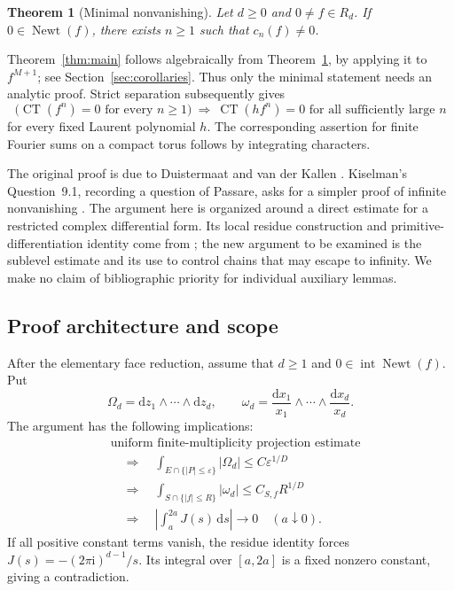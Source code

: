 \documentclass[11pt]{article}
\numberwithin{equation}{section}
\newtheorem{theorem}{Theorem}[section]
\theoremstyle{definition}
\theoremstyle{remark}
\newcommand{\CT}{\operatorname{CT}}
\newcommand{\Newt}{\operatorname{Newt}}
\newcommand{\Int}{\operatorname{int}}
\newcommand{\dd}{\mathrm d}
\newcommand{\ii}{\mathrm i}
\newcommand{\OmegaD}{\Omega_d}
\newcommand{\omegaD}{\omega_d}
\begin{document}
\begin{theorem}[Minimal nonvanishing]\label{thm:minimal}
Let $d\ge0$ and $0\ne f\in R_d$. If $0\in\Newt(f)$, there exists
$n\ge1$ such that $c_n(f)\ne0$.
\end{theorem}

Theorem~\ref{thm:main} follows algebraically from
Theorem~\ref{thm:minimal}, by applying it to $f^{M+1}$; see
Section~\ref{sec:corollaries}. Thus only the minimal statement needs an
analytic proof. Strict separation subsequently gives
\[
 \bigl(\CT(f^n)=0\text{ for every }n\ge1\bigr)
 \ \Longrightarrow\
 \CT(hf^n)=0\text{ for all sufficiently large }n
\]
for every fixed Laurent polynomial $h$. The corresponding assertion for
finite Fourier sums on a compact torus follows by integrating characters.

The original proof is due to Duistermaat and van der Kallen
\cite{DvK}. Kiselman's Question~9.1, recording a question of Passare,
asks for a simpler proof of infinite nonvanishing
\cite{Kiselman}. The argument here is organized around a direct estimate
for a restricted complex differential form. Its local residue construction
and primitive-differentiation identity come from
\cite[Sections 4--5]{DvK}; the new argument to be examined is the
sublevel estimate and its use to control chains that may escape to infinity.
We make no claim of bibliographic priority for individual auxiliary lemmas.

\subsection*{Proof architecture and scope}
After the elementary face reduction, assume that $d\ge1$ and
$0\in\Int\Newt(f)$. Put
\[
 \OmegaD=\dd z_1\wedge\cdots\wedge\dd z_d,\qquad
 \omegaD=\frac{\dd x_1}{x_1}\wedge\cdots\wedge\frac{\dd x_d}{x_d}.
\]
The argument has the following implications:
\begin{align*}
 &\text{uniform finite-multiplicity projection estimate}\\
 &\quad\Longrightarrow\quad
 \int_{E\cap\{|P|\le\varepsilon\}}|\OmegaD|
       \le C\varepsilon^{1/D}\\
 &\quad\Longrightarrow\quad
 \int_{S\cap\{|f|\le R\}}|\omegaD|\le C_{S,f}R^{1/D}\\
 &\quad\Longrightarrow\quad
 \left|\int_a^{2a}J(s)\,\dd s\right|\longrightarrow0
       \quad(a\downarrow0).
\end{align*}
If all positive constant terms vanish, the residue identity forces
$J(s)=-(2\pi\ii)^{d-1}/s$. Its integral over $[a,2a]$ is a fixed nonzero
constant, giving a contradiction.
\end{document}
